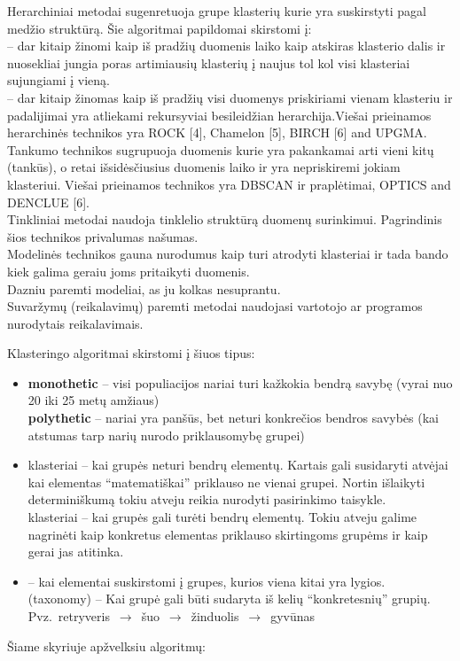 \documentclass{VUMIFInfKursinis}
\begin{document}
	Herarchiniai metodai sugenretuoja  grupe klasterių kurie yra suskirstyti pagal medžio struktūrą. Šie algoritmai papildomai skirstomi į:\\
		 – dar kitaip žinomi kaip  iš pradžių duomenis laiko kaip atskiras klasterio dalis ir nuosekliai jungia poras artimiausių klasterių į naujus tol kol visi klasteriai sujungiami į vieną.\\
		 – dar kitaip žinomas kaip  iš pradžių visi duomenys priskiriami vienam klasteriu ir padalijimai yra atliekami rekursyviai besileidžian herarchija.Viešai prieinamos herarchinės technikos yra ROCK [4], Chamelon [5], BIRCH [6] and UPGMA. \\
		Tankumo technikos sugrupuoja duomenis kurie yra pakankamai arti vieni kitų (tankūs), o retai išsidėsčiusius duomenis laiko  ir yra nepriskiremi jokiam klasteriui. Viešai prieinamos technikos yra DBSCAN ir praplėtimai, OPTICS and DENCLUE [6].\\
		Tinkliniai metodai naudoja  tinklelio struktūrą duomenų surinkimui. Pagrindinis šios technikos privalumas \textendash{} našumas.\\
		Modelinės technikos gauna nurodumus kaip turi atrodyti klasteriai ir tada bando kiek galima geraiu joms pritaikyti duomenis.\\
		Dazniu paremti modeliai, as ju kolkas nesuprantu.\\
	Suvaržymų (reikalavimų) paremti metodai naudojasi vartotojo ar programos nurodytais reikalavimais.


	Klasteringo algoritmai skirstomi į šiuos tipus:
	\begin{itemize}
		\item \textbf{monothetic }– visi populiacijos nariai turi kažkokia bendrą savybę (vyrai nuo 20 iki 25 metų amžiaus)
			\\\textbf{polythetic }– nariai yra panšūs, bet neturi konkrečios bendros savybės (kai atstumas tarp narių nurodo priklausomybę grupei)
		\item {} klasteriai – kai grupės neturi bendrų elementų. Kartais gali susidaryti atvėjai kai elementas “matematiškai” priklauso ne vienai grupei. Nortin išlaikyti determiniškumą tokiu atveju reikia nurodyti pasirinkimo taisykle.
			\\ klasteriai – kai grupės gali turėti bendrų elementų. Tokiu atveju galime nagrinėti kaip konkretus elementas priklauso skirtingoms grupėms ir kaip gerai jas atitinka.
		\item {} – kai elementai suskirstomi į grupes, kurios viena kitai yra lygios.
			\\ (taxonomy) – Kai grupė gali būti sudaryta iš kelių “konkretesnių” grupių. Pvz.\ retryveris $\,\to\,$ šuo $\,\to\,$ žinduolis $\,\to\,$ gyvūnas
	\end{itemize}
	Šiame skyriuje apžvelksiu algoritmų:
\end{document}
